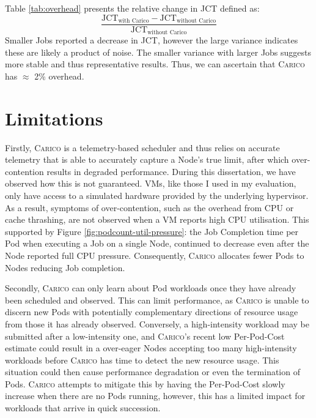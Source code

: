 Table \ref{tab:overhead} presents the relative change in JCT defined as:
\[
\frac{\text{JCT}_{\text{with Carico}} - \text{JCT}_{\text{without
Carico}}}{\text{JCT}_{\text{without Carico}}}
\]
Smaller Jobs reported a decrease
in JCT, however the large variance indicates these are likely a product of
noise. The smaller variance with larger Jobs suggests more stable and thus
representative results. Thus, we can ascertain that \textsc{Carico} has
$\approx$ 2\% overhead.

\section{Limitations}

Firstly, \textsc{Carico} is a telemetry-based scheduler and thus relies on accurate
telemetry that is able to accurately capture a Node's true limit, after which
over-contention results in degraded performance. During this dissertation, we
have observed how this is not guaranteed. VMs, like those I used in my
evaluation, only have access to a simulated hardware provided by the underlying
hypervisor. As a result, symptoms of over-contention, such as the overhead from
CPU or cache thrashing, are not observed when a VM reports high CPU utilisation.
This supported by Figure \ref{fig:podcount-util-pressure}: the Job Completion
time per Pod when executing a Job on a single Node, continued to decrease even
after the Node reported full CPU pressure. Consequently, \textsc{Carico}
allocates fewer Pods to Nodes reducing Job completion.

Secondly, \textsc{Carico} can only learn about Pod workloads once they have
already been scheduled and observed. This can limit performance, as
\textsc{Carico} is unable to discern new Pods with potentially complementary directions
of resource usage from those it has already observed. Conversely, a
high-intensity workload may be submitted after a low-intensity one, and
\textsc{Carico}'s recent low Per-Pod-Cost estimate could result in a over-eager
Nodes accepting too many high-intensity workloads before \textsc{Carico} has
time to detect the new resource usage. This situation could then cause
performance degradation or even the termination of Pods. \textsc{Carico}
attempts to mitigate this by having the Per-Pod-Cost slowly increase when there
are no Pods running, however, this has a limited impact for workloads that
arrive in quick succession.
